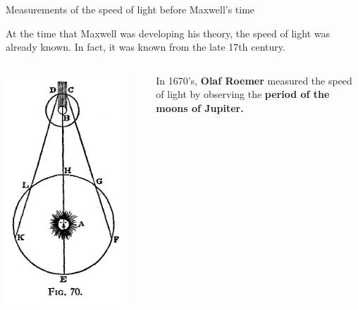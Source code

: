 \begin{frame}{Measurements of the speed of light before Maxwell's time}

At the time that Maxwell was developing his theory, the speed of light was already known.
In fact, it was known from the late 17th century.\\

\vspace{0.2cm}

\begin{columns}
  \begin{column}{0.33\textwidth}
    \includegraphics[width=0.90\textwidth]{./images/schematics/illustration_from_1676_article_on_the_speed_of_light.jpg}\\
  \end{column}
  \begin{column}{0.67\textwidth}
      In 1670's, {\bf Olaf Roemer} measured the speed of light by observing the {\bf period of the moons of Jupiter.}\\


\end{column}
\end{columns}
\end{frame}
